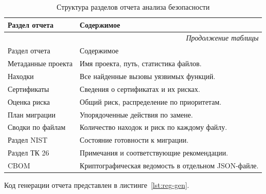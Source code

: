\documentclass{itmo-vkr}
\begin{document}
\begin{longtable}{|p{4.5cm}|p{10.0cm}|}
	\caption{Структура разделов отчета анализа безопасности} \label{tab:report_structure} \\
	\hline
	Раздел отчета & Содержимое \\ \hline
	\endfirsthead
	\multicolumn{2}{r}{\textit{Продолжение таблицы \thetable}} \\ \hline
	Раздел отчета & Содержимое \\ \hline
	\endhead
	\hline
	\endlastfoot

	\hspace{0pt}Метаданные проекта & \hspace{0pt}Имя проекта, путь, статистика файлов. \\ \hline
	\hspace{0pt}Находки & \hspace{0pt}Все найденные вызовы уязвимых функций. \\ \hline
	\hspace{0pt}Сертификаты & \hspace{0pt}Сведения о сертификатах и их рисках. \\ \hline
	\hspace{0pt}Оценка риска & \hspace{0pt}Общий риск, распределение по приоритетам. \\ \hline
	\hspace{0pt}План миграции & \hspace{0pt}Упорядоченные действия по замене. \\ \hline
	\hspace{0pt}Сводки по файлам & \hspace{0pt}Количество находок и риск по каждому файлу. \\ \hline
	\hspace{0pt}Раздел NIST & \hspace{0pt}Состояние готовности к миграции. \\ \hline
	\hspace{0pt}Раздел ТК 26 & \hspace{0pt}Примечания и соответствующие рекомендации. \\ \hline
	\hspace{0pt}CBOM & \hspace{0pt}Криптографическая ведомость в отдельном JSON-файле. \\ 
\end{longtable}

Код генерации отчета представлен в листинге~\ref{lst:reg-gen}.
\end{document}
